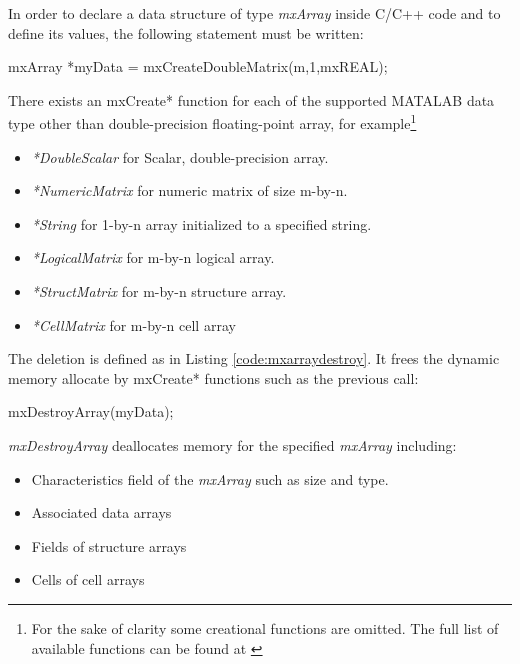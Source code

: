 \documentclass[12pt,a4paper]{extarticle}
\begin{document}
In order to declare a data structure of type \textit{mxArray} inside C/C++ code and to define its values, the following statement must be written:
\begin{cpp}[caption={Declaration and definition of a floating-point non complex mxArray named myData of size m-by-1, initialized to 0},label=code:createmydata] 
mxArray *myData = mxCreateDoubleMatrix(m,1,mxREAL);
\end{cpp}

There exists an mxCreate* function for each of the supported MATALAB data type other than double-precision floating-point array, for example\footnote{For the sake of clarity some creational functions are omitted. The full list of available functions can be found at \cite{create_del_mxarray:2}} 
\begin{itemize}
\item \textit{*DoubleScalar} for Scalar, double-precision array.
\item \textit{*NumericMatrix} for numeric matrix of size m-by-n.
\item \textit{*String} for 1-by-n array initialized to a specified string.
\item \textit{*LogicalMatrix} for m-by-n logical array.
\item \textit{*StructMatrix} for m-by-n structure array.
\item \textit{*CellMatrix} for m-by-n cell array
\end{itemize}

The deletion is defined as in Listing \ref{code:mxarraydestroy}. It frees the dynamic memory allocate by mxCreate* functions such as the previous call:

\begin{cpp}[caption={Deallocation of dynamic memory referred by myData \textit{mxArray} pointer, from Listing \ref{code:createmydata}},label=code:mxarraydestroy]
mxDestroyArray(myData);
\end{cpp}

\textit{mxDestroyArray} deallocates memory for the specified \textit{mxArray} including:
\begin{itemize}
\item Characteristics field of the \textit{mxArray} such as size and type.
\item Associated data arrays
\item Fields of structure arrays
\item Cells of cell arrays
\end{itemize}
\end{document}
